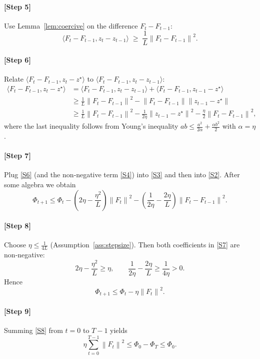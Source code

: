 \documentclass[11pt]{article}
\newcommand{\norm}[1]{\left\lVert #1\right\rVert}
\newcommand{\ip}[2]{\langle #1,#2\rangle}
\begin{document}
\paragraph{[Step 5]} Use Lemma~\ref{lem:coercive} on the difference $F_t-F_{t-1}$:
\[
\ip{F_t-F_{t-1}}{z_t-z_{t-1}}
\;\ge\;\frac{1}{L}\norm{F_t-F_{t-1}}^2 .
\tag{S5}
\]

\paragraph{[Step 6]} Relate $\ip{F_t-F_{t-1}}{z_t-z^\star}$ to $\ip{F_t-F_{t-1}}{z_t-z_{t-1}}$:
\[
\begin{aligned}
\ip{F_t-F_{t-1}}{z_t-z^\star}
&=\ip{F_t-F_{t-1}}{z_t-z_{t-1}}+\ip{F_t-F_{t-1}}{z_{t-1}-z^\star}\\
&\ge\frac{1}{L}\norm{F_t-F_{t-1}}^2-\norm{F_t-F_{t-1}}\norm{z_{t-1}-z^\star} \\
&\ge\frac{1}{L}\norm{F_t-F_{t-1}}^2-\frac{1}{2\eta}\norm{z_{t-1}-z^\star}^2-\frac{\eta}{2}\norm{F_t-F_{t-1}}^2,
\end{aligned}
\tag{S6}
\]
where the last inequality follows from Young’s inequality $ab\le \frac{a^2}{2\alpha}+\frac{\alpha b^2}{2}$ with $\alpha=\eta$.

\paragraph{[Step 7]} Plug \eqref{S6} (and the non‑negative term \eqref{S4}) into \eqref{S3} and then into \eqref{S2}. After some algebra we obtain
\[
\Phi_{t+1}\le \Phi_t
-\left(2\eta-\frac{\eta^2}{L}\right)\norm{F_t}^2
-\left(\frac{1}{2\eta}-\frac{2\eta}{L}\right)\norm{F_t-F_{t-1}}^2 .
\tag{S7}
\]

\paragraph{[Step 8]} Choose $\eta\le\frac{1}{4L}$ (Assumption~\ref{ass:stepsize}). Then both coefficients in \eqref{S7} are non‑negative:
\[
2\eta-\frac{\eta^2}{L}\ge\eta,\qquad 
\frac{1}{2\eta}-\frac{2\eta}{L}\ge\frac{1}{4\eta}>0.
\]
Hence
\[
\Phi_{t+1}\le \Phi_t-\eta\norm{F_t}^2.
\tag{S8}
\]

\paragraph{[Step 9]} Summing \eqref{S8} from $t=0$ to $T-1$ yields
\[
\eta\sum_{t=0}^{T-1}\norm{F_t}^2\le\Phi_0-\Phi_T\le\Phi_0.
\tag{S9}
\]
\end{document}
